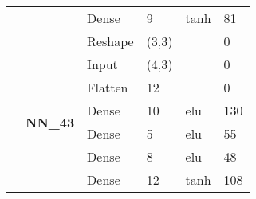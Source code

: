 \begin{table}[H]
\begin{center}
\begin{tabular}{ll|l|l|l|l|}
\multicolumn{1}{|l|}{}                                                                       &                                  & Dense                              & 9                                    & tanh                                     & 81                                          \\ \cline{3-6} 
\multicolumn{1}{|l|}{}                                                                       &                                  & Reshape                            & (3,3)                                &                                          & 0                                           \\ \cline{2-6} 
\multicolumn{1}{|l|}{}                                                                       & \multirow{7}{*}{\textbf{NN\_43}} & Input                              & (4,3)                                &                                          & 0                                           \\ \cline{3-6} 
\multicolumn{1}{|l|}{}                                                                       &                                  & Flatten                            & 12                                   &                                          & 0                                           \\ \cline{3-6} 
\multicolumn{1}{|l|}{}                                                                       &                                  & Dense                              & 10                                    & elu                                     & 130                                         \\ \cline{3-6} 
\multicolumn{1}{|l|}{}                                                                       &                                  & Dense                              & 5                                    & elu                                     & 55                                          \\ \cline{3-6} 
\multicolumn{1}{|l|}{}                                                                       &                                  & Dense                              & 8                                    & elu                                     & 48                                          \\ \cline{3-6} 
\multicolumn{1}{|l|}{}                                                                       &                                  & Dense                              & 12                                   & tanh                                     & 108                                         \\ \cline{3-6} 

\end{tabular}
\end{center}
\end{table}
